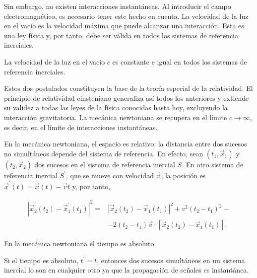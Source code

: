 Sin embargo, no existen interacciones instantáneas. Al introducir el campo electromagnético, es necesario tener este hecho en cuenta. La velocidad de la
luz en el vacío es la velocidad máxima que puede alcanzar una interacción. Esta es una ley física y, por tanto, debe ser válida en todos los sistemas de referencia inerciales.

\begin{proposition}
  La velocidad de la luz en el vacío $c$ es constante e igual en todos los sistemas de referencia inerciales.
\end{proposition}

Estos dos postulados constituyen la base de la teoría especial de la relatividad. El principio de relatividad einsteniano generaliza así todos los anteriores y extiende su validez a todas las leyes de la física conocidas hasta hoy, excluyendo la interacción gravitatoria. La mecánica newtoniana se recupera en el límite $c \rightarrow \infty$, es decir, en el límite de interacciones instantáneas.

En la mecánica newtoniana, el espacio es relativo: la distancia entre dos sucesos no simultáneos depende del sistema de referencia. En efecto, sean $\left(t_{1}, \vec{x}_{1}\right)$ y $\left(t_{2}, \vec{x}_{2}\right)$ dos sucesos en el sistema de referencia inercial $S$. En otro sistema de referencia inercial $S^{\prime}$, que se mueve con velocidad $\vec{v}$, la posición es $\vec{x}^{\prime}(t)=\vec{x}(t)-\vec{v} t$ y, por tanto,

\[\begin{aligned}
  \left|\vec{x}_{2}^{\prime}\left(t_{2}\right)-\vec{x}_{1}^{\prime}\left(t_{1}\right)\right|^{2}= & \left|\vec{x}_{2}\left(t_{2}\right)-\vec{x}_{1}\left(t_{1}\right)\right|^{2}+v^{2}\left(t_{2}-t_{1}\right)^{2}- \\
  & -2\left(t_{2}-t_{1}\right) \vec{v} \cdot\left[\vec{x}_{2}\left(t_{2}\right)-\vec{x}_{1}\left(t_{1}\right)\right] .
  \end{aligned}\]

  En la mecánica newtoniana el tiempo es absoluto 

  \begin{lemma}
    Si el tiempo es absoluto, $t^{\prime}=t$, entonces dos sucesos simultáneos en un sistema inercial lo son en cualquier otro ya que la propagación de señales es instantánea.
  \end{lemma}

